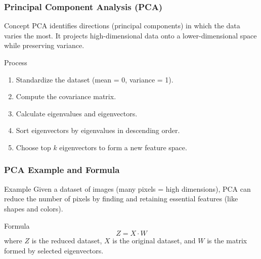 \documentclass[aspectratio=169]{beamer}
\begin{document}
\begin{frame}[fragile]
    \frametitle{Principal Component Analysis (PCA)}
    \begin{block}{Concept}
        PCA identifies directions (principal components) in which the data varies the most. It projects high-dimensional data onto a lower-dimensional space while preserving variance.
    \end{block}
    \begin{block}{Process}
        \begin{enumerate}
            \item Standardize the dataset (mean = 0, variance = 1).
            \item Compute the covariance matrix.
            \item Calculate eigenvalues and eigenvectors.
            \item Sort eigenvectors by eigenvalues in descending order.
            \item Choose top \(k\) eigenvectors to form a new feature space.
        \end{enumerate}
    \end{block}
\end{frame}

\begin{frame}[fragile]
    \frametitle{PCA Example and Formula}
    \begin{block}{Example}
        Given a dataset of images (many pixels = high dimensions), PCA can reduce the number of pixels by finding and retaining essential features (like shapes and colors).
    \end{block}
    \begin{block}{Formula}
        \begin{equation}
            Z = X \cdot W
        \end{equation}
        where \(Z\) is the reduced dataset, \(X\) is the original dataset, and \(W\) is the matrix formed by selected eigenvectors.
    \end{block}
\end{frame}
\end{document}

